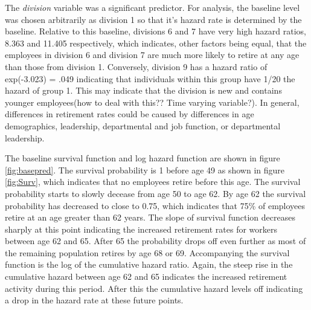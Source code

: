 \documentclass[12pt,letterpaper]{article}
\begin{document}
The {\it division} variable was a significant predictor.  For analysis, the baseline level was chosen arbitrarily as division 1 so that it's hazard rate is determined by the baseline.  Relative to this baseline, divisions 6 and 7 have very high hazard ratios, 8.363 and 11.405 respectively, which indicates, other factors being equal, that the employees in division 6 and division 7 are much more likely to retire at any age than those from division 1.  Conversely, division 9 has a hazard ratio of exp(-3.023) = .049 indicating that individuals within this group have 1/20 the hazard of group 1.  This may indicate that the division is new and contains younger employees(how to deal with this??  Time varying variable?).  In general, differences in retirement rates could be caused by differences in age demographics, leadership, departmental and job function, or departmental leadership.

The baseline survival function and log hazard function are shown in figure \ref{fig:basepred}. The survival probability is 1 before age 49 as shown in figure \ref{fig:Surv}, which indicates that no employees retire before this age. The survival probability starts to slowly decease from age 50 to age 62. By age 62 the survival probability has decreased to close to 0.75, which indicates that 75\% of employees retire at an age greater than 62 years.  The slope of survival function decreases sharply at this point indicating the increased retirement rates for workers between age 62 and 65.  After 65 the probability drops off even further as most of the remaining population retires by age 68 or 69. Accompanying the survival function is the log of the cumulative hazard ratio.  Again, the steep rise in the cumulative hazard between age 62 and 65 indicates the increased retirement activity during this period.  After this the cumulative hazard levels off indicating a drop in the hazard rate at these future points.



\end{document}
